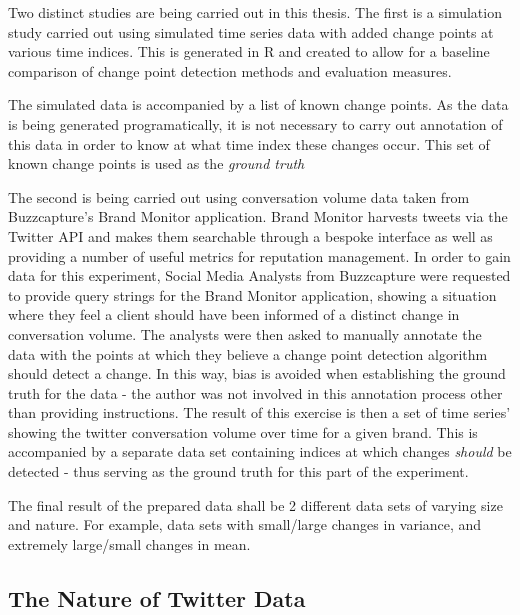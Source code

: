 \documentclass{uvamscse}	%
\begin{document}
Two distinct studies are being carried out in this thesis. The first is a simulation study carried out using simulated time series data with added change points at various time indices. This is generated in \textsf{R} and created to allow for a baseline comparison of change point detection methods and evaluation measures.

The simulated data is accompanied by a list of known change points. As the data is being generated programatically, it is not necessary to carry out annotation of this data in order to know at what time index these changes occur. This set of known change points is used as the \emph{ground truth} 

The second is being carried out using conversation volume data taken from Buzzcapture's Brand Monitor application. Brand Monitor harvests tweets via the Twitter API and makes them searchable through a bespoke interface as well as providing a number of useful metrics for reputation management. In order to gain data for this experiment, Social Media Analysts from Buzzcapture were requested to provide query strings for the Brand Monitor application, showing a situation where they feel a client should have been informed of a distinct change in conversation volume. The analysts were then asked to manually annotate the data with the points at which they believe a change point detection algorithm should detect a change. In this way, bias is avoided when establishing the ground truth for the data - the author was not involved in this annotation process other than providing instructions. The result of this exercise is then a set of time series' showing the twitter conversation volume over time for a given brand. This is accompanied by a separate data set containing indices at which changes \emph{should} be detected - thus serving as the ground truth for this part of the experiment.

The final result of the prepared data shall be 2 different data sets of varying size and nature. For example, data sets with small/large changes in variance, and extremely large/small changes in mean.

\subsection{The Nature of Twitter Data}
\end{document}
